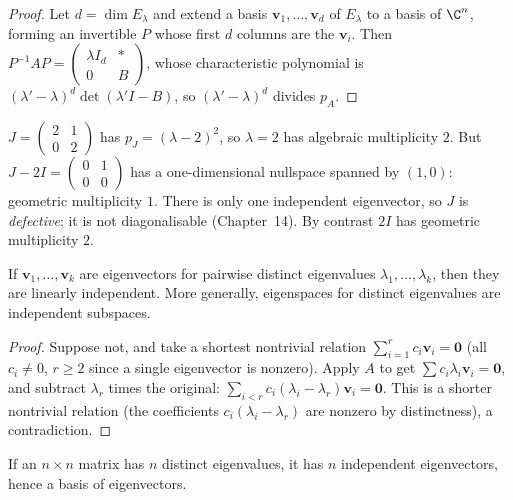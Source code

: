 \begin{proof}
Let $d=\dim E_\lambda$ and extend a basis $\mathbf{v}_1,\dots,\mathbf{v}_d$ of $E_\lambda$ to a basis of $\C^n$, forming an invertible $P$ whose first $d$ columns are the $\mathbf{v}_i$. Then $P^{-1}AP=\begin{pmatrix}\lambda I_d&*\\0&B\end{pmatrix}$, whose characteristic polynomial is $(\lambda'-\lambda)^d\det(\lambda' I-B)$, so $(\lambda'-\lambda)^d$ divides $p_A$.
\end{proof}

\begin{example}\label{ex:defective}
$J=\begin{pmatrix}2&1\\0&2\end{pmatrix}$ has $p_J=(\lambda-2)^2$, so $\lambda=2$ has algebraic multiplicity $2$. But $J-2I=\begin{pmatrix}0&1\\0&0\end{pmatrix}$ has a one-dimensional nullspace spanned by $(1,0)$: geometric multiplicity $1$. There is only one independent eigenvector, so $J$ is \emph{defective}; it is not diagonalisable (Chapter~14). By contrast $2I$ has geometric multiplicity $2$.
\end{example}

\begin{theorem}\label{thm:eigindep}
If $\mathbf{v}_1,\dots,\mathbf{v}_k$ are eigenvectors for pairwise distinct eigenvalues $\lambda_1,\dots,\lambda_k$, then they are linearly independent. More generally, eigenspaces for distinct eigenvalues are independent subspaces.
\end{theorem}

\begin{proof}
Suppose not, and take a shortest nontrivial relation $\sum_{i=1}^rc_i\mathbf{v}_{i}=\mathbf{0}$ (all $c_i\neq0$, $r\ge2$ since a single eigenvector is nonzero). Apply $A$ to get $\sum c_i\lambda_i\mathbf{v}_i=\mathbf{0}$, and subtract $\lambda_r$ times the original: $\sum_{i<r}c_i(\lambda_i-\lambda_r)\mathbf{v}_i=\mathbf{0}$. This is a shorter nontrivial relation (the coefficients $c_i(\lambda_i-\lambda_r)$ are nonzero by distinctness), a contradiction.
\end{proof}

\begin{corollary}\label{cor:distinct}
If an $n\times n$ matrix has $n$ distinct eigenvalues, it has $n$ independent eigenvectors, hence a basis of eigenvectors.
\end{corollary}

